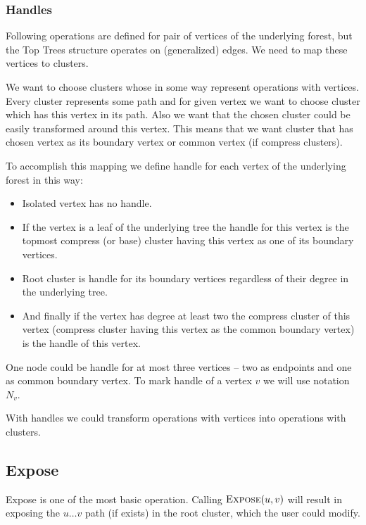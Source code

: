 \subsubsection{Handles}

Following operations are defined for pair of vertices of the underlying forest,
but the Top Trees structure operates on (generalized) edges. We need to map
these vertices to clusters.

We want to choose clusters whose in some way represent operations with
vertices. Every cluster represents some path and for given vertex we want to
choose cluster which has this vertex in its path. Also we want that the chosen
cluster could be easily transformed around this vertex. This means that we want
cluster that has chosen vertex as its boundary vertex or common vertex
(if compress clusters).

To accomplish this mapping we define {\I handle} for each vertex of the
underlying forest in this way:

\begin{itemize}
\item Isolated vertex has no handle.
\item If the vertex is a leaf of the underlying tree the
handle for this vertex is the topmost compress (or base) cluster having this
vertex as one of its boundary vertices.
\item Root cluster is handle for its boundary vertices regardless of their
degree in the underlying tree.
\item And finally if the vertex has degree at least two the compress cluster of
this vertex (compress cluster having this vertex as the common boundary vertex)
is the handle of this vertex.
\end{itemize}

One node could be handle for at most three vertices -- two as endpoints and one
as common boundary vertex. To mark handle of a vertex $v$ we will use notation
$N_v$.

With handles we could transform operations with vertices into operations with
clusters.

\subsection{\sc Expose}

Expose is one of the most basic operation. Calling $\hbox{\sc Expose}(u,v)$ will result in
exposing the $u\dots v$ path (if exists) in the root cluster, which the user
could modify.

